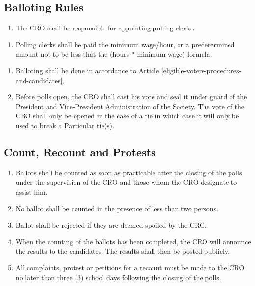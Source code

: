 \subsection{Balloting Rules}\label{balloting-rules}

\begin{enumerate}
\def\labelenumi{\arabic{enumi}.}
\tightlist
\item
  The CRO shall be responsible for appointing polling clerks.
\end{enumerate}

\begin{enumerate}
\def\labelenumi{(\alph{enumi})}
\tightlist
\item
  Polling clerks shall be paid the minimum wage/hour, or a predetermined
  amount not to be less that the (hours * minimum wage) formula.
\end{enumerate}

\begin{enumerate}
\def\labelenumi{\arabic{enumi}.}
\setcounter{enumi}{1}
\item
  Balloting shall be done in accordance to Article \ref{eligible-voters-procedures-and-candidates}.
\item
  Before polls open, the CRO shall cast his vote and seal it under guard
  of the President and Vice-President Administration of the Society. The
  vote of the CRO shall only be opened in the case of a tie in which
  case it will only be used to break a Particular tie(s).
\end{enumerate}

\subsection{Count, Recount and
Protests}\label{count-recount-and-protests}

\begin{enumerate}
\def\labelenumi{\arabic{enumi}.}
\item
  Ballots shall be counted as soon as practicable after the closing of
  the polls under the supervision of the CRO and those whom the CRO
  designate to assist him.
\item
  No ballot shall be counted in the presence of less than two persons.
\item
  Ballot shall be rejected if they are deemed spoiled by the CRO.
\item
  When the counting of the ballots has been completed, the CRO will
  announce the results to the candidates. The results shall then be
  posted publicly.
\item
  All complaints, protest or petitions for a recount must be made to the
  CRO no later than three (3) school days following the closing of the
  polls.
\end{enumerate}

